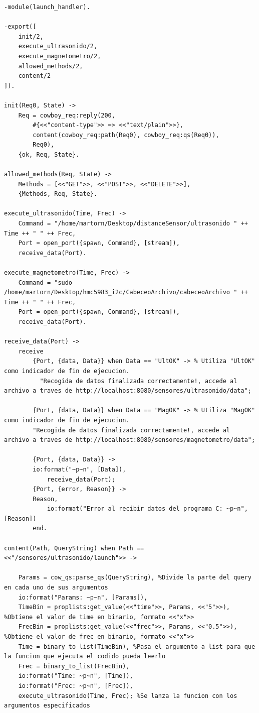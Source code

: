 \lstset{language=Erlang, breaklines=true, basicstyle=\sffamily\footnotesize}
\begin{lstlisting}[frame=single, caption=launch\_handler.erl]
-module(launch_handler).

-export([
    init/2,
    execute_ultrasonido/2,
    execute_magnetometro/2,
    allowed_methods/2,
    content/2
]).

init(Req0, State) ->
    Req = cowboy_req:reply(200,
        #{<<"content-type">> => <<"text/plain">>},
        content(cowboy_req:path(Req0), cowboy_req:qs(Req0)),
        Req0),
    {ok, Req, State}.

allowed_methods(Req, State) ->
    Methods = [<<"GET">>, <<"POST">>, <<"DELETE">>],
    {Methods, Req, State}.
    
execute_ultrasonido(Time, Frec) ->
    Command = "/home/martorn/Desktop/distanceSensor/ultrasonido " ++ Time ++ " " ++ Frec,
    Port = open_port({spawn, Command}, [stream]),
    receive_data(Port).

execute_magnetometro(Time, Frec) ->
    Command = "sudo /home/martorn/Desktop/hmc5983_i2c/CabeceoArchivo/cabeceoArchivo " ++ Time ++ " " ++ Frec,
    Port = open_port({spawn, Command}, [stream]),
    receive_data(Port).

receive_data(Port) ->
    receive
        {Port, {data, Data}} when Data == "UltOK" -> % Utiliza "UltOK" como indicador de fin de ejecucion.
          "Recogida de datos finalizada correctamente!, accede al archivo a traves de http://localhost:8080/sensores/ultrasonido/data";
        
        {Port, {data, Data}} when Data == "MagOK" -> % Utiliza "MagOK" como indicador de fin de ejecucion.
        "Recogida de datos finalizada correctamente!, accede al archivo a traves de http://localhost:8080/sensores/magnetometro/data";
        
        {Port, {data, Data}} ->
		io:format("~p~n", [Data]),
            receive_data(Port);
        {Port, {error, Reason}} ->
		Reason,
            io:format("Error al recibir datos del programa C: ~p~n", [Reason])
        end.
    
content(Path, QueryString) when Path == <<"/sensores/ultrasonido/launch">> ->
	
	Params = cow_qs:parse_qs(QueryString), %Divide la parte del query en cada uno de sus argumentos
	io:format("Params: ~p~n", [Params]),
	TimeBin = proplists:get_value(<<"time">>, Params, <<"5">>), %Obtiene el valor de time en binario, formato <<"x">>
	FrecBin = proplists:get_value(<<"frec">>, Params, <<"0.5">>), %Obtiene el valor de frec en binario, formato <<"x">>
	Time = binary_to_list(TimeBin), %Pasa el argumento a list para que la funcion que ejecuta el codido pueda leerlo
	Frec = binary_to_list(FrecBin),
	io:format("Time: ~p~n", [Time]),
	io:format("Frec: ~p~n", [Frec]),
    execute_ultrasonido(Time, Frec); %Se lanza la funcion con los argumentos especificados
		

\end{lstlisting}
